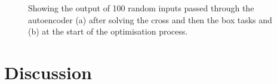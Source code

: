 \documentclass[runningheads,a4paper]{llncs}
\begin{document}
\begin{figure}[!]
\centering
{}
\caption[Optional caption for list of figures]{Showing the output of 100 random inputs passed through the autoencoder (a) after solving the cross and then the box tasks and (b) at the start of the optimisation process.}
\label{figure:experiment_subplots}
\end{figure}
\section{Discussion}
\end{document}
